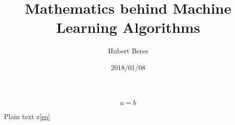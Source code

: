 \documentclass[a4paper]{article}
\title{Mathematics behind Machine Learning Algorithms}
\author{Hubert Beres}
\date{2018/01/08}
\theoremstyle{break}
\begin{document}
\begin{equation}
    \label{eq}
    a = b
\end{equation}

Plain text z\ref{eq}
\end{document}
